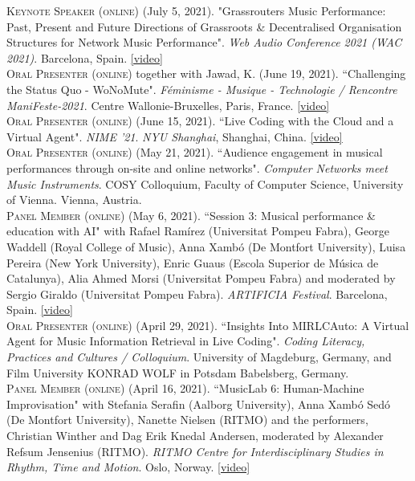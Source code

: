 \documentclass[10pt, a4paper]{article}
\newcommand{\years}[1]{\marginnote{\scriptsize #1}}
\begin{document}
{\years{2021h} \textsc{Keynote Speaker (online)} (July 5, 2021). "Grassrouters Music Performance: Past, Present and Future Directions of Grassroots \& Decentralised Organisation Structures for Network Music Performance". \emph{Web Audio Conference 2021 (WAC 2021)}. Barcelona, Spain. \href{https://youtu.be/7SWu3txbg-w}{[video]}\\ 
\years{2021g} \textsc{Oral Presenter (online)} together with Jawad, K. (June 19, 2021). ``Challenging the Status Quo - WoNoMute". \emph{Féminisme - Musique - Technologie / Rencontre ManiFeste-2021}. Centre Wallonie-Bruxelles, Paris, France. \href{https://youtu.be/jXmNvd9ty_o}{[video]}\\
\years{2021f} \textsc{Oral Presenter (online)} (June 15, 2021). “Live Coding with the Cloud and a Virtual Agent". \emph{NIME '21}. 
\emph{NYU Shanghai}, Shanghai, China. \href{https://youtu.be/F4UoH1hRMoU}{[video]}\\
\years{2021e} \textsc{Oral Presenter (online)} (May 21, 2021). “Audience engagement in musical performances through on-site and online networks". \emph{Computer Networks meet Music Instruments}. COSY Colloquium, Faculty of Computer Science, University of Vienna. Vienna, Austria.\\ 
\years{2021d} \textsc{Panel Member (online)} (May 6, 2021). “Session 3: Musical performance \& education with AI" with Rafael Ramírez (Universitat Pompeu Fabra), George Waddell (Royal College of Music), Anna Xambó (De Montfort University), Luisa Pereira (New York University), Enric Guaus (Escola Superior de Música de Catalunya), Alia Ahmed Morsi (Universitat Pompeu Fabra) and moderated by Sergio Giraldo (Universitat Pompeu Fabra). \emph{ARTIFICIA Festival}. Barcelona, Spain. \href{https://youtu.be/o0arHV4s6Mo}{[video]}\\ 
\years{2021c} \textsc{Oral Presenter (online)} (April 29, 2021). “Insights Into MIRLCAuto: A Virtual Agent for Music Information Retrieval in Live Coding". \emph{Coding Literacy, Practices and Cultures / Colloquium}. University of Magdeburg, Germany, and Film University KONRAD WOLF in Potsdam Babelsberg, Germany.\\ 
\years{2021b} \textsc{Panel Member (online)} (April 16, 2021). “MusicLab 6: Human-Machine Improvisation" with Stefania Serafin (Aalborg University), Anna Xambó Sedó (De Montfort University), Nanette Nielsen (RITMO) and the performers, Christian Winther and Dag Erik Knedal Andersen, moderated by Alexander Refsum Jensenius (RITMO). \emph{RITMO Centre for Interdisciplinary Studies in Rhythm, Time and Motion}. Oslo, Norway. \href{https://youtu.be/yeIRxkm-kSc}{[video]}\\ 
}
\end{document}
